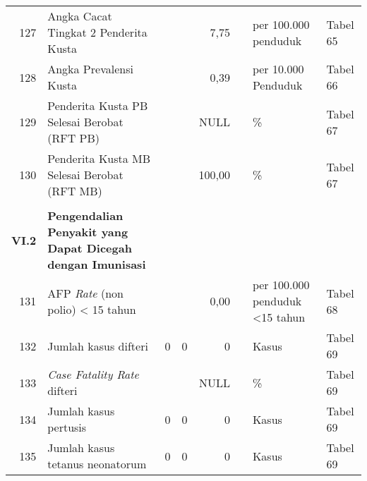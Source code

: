 \begin{small}
\begin{longtable}{rY{12em}rrrrY{5em}Y{5em}}
	127 & Angka Cacat Tingkat 2 Penderita Kusta                                                 &        &        &    7,75 &                   & per 100.000 penduduk           & Tabel 65 \\
	                  128 & Angka Prevalensi Kusta                                                                &        &        &    0,39 &                   & per 10.000 Penduduk            & Tabel 66 \\
	129 & Penderita Kusta PB Selesai Berobat (RFT PB)                                           &        &        &    NULL &                   & \%                             & Tabel 67 \\
	                  130 & Penderita Kusta MB Selesai Berobat (RFT MB)                                           &        &        &  100,00 &                   & \%                             & Tabel 67 \\
	                      &                                                                                       &        &        &         &                   &                                &          \\
	        \textbf{VI.2} & \textbf{Pengendalian Penyakit yang Dapat Dicegah dengan Imunisasi}                    &        &        &         &                   &                                &          \\
	                  131 & AFP \emph{Rate} (non polio) < 15 tahun                                                &        &        &    0,00 &                   & per 100.000 penduduk <15 tahun & Tabel 68 \\
	132 & Jumlah kasus difteri                                                                  &      0 &      0 &       0 &                   & Kasus                          & Tabel 69 \\
	                  133 & \emph{Case Fatality Rate} difteri                                                     &        &        &    NULL &                   & \%                             & Tabel 69 \\
	134 & Jumlah kasus pertusis                                                                 &      0 &      0 &       0 &                   & Kasus                          & Tabel 69 \\
	                  135 & Jumlah kasus tetanus neonatorum                                                       &      0 &      0 &       0 &                   & Kasus                          & Tabel 69 \\

\end{longtable}
\end{small}
